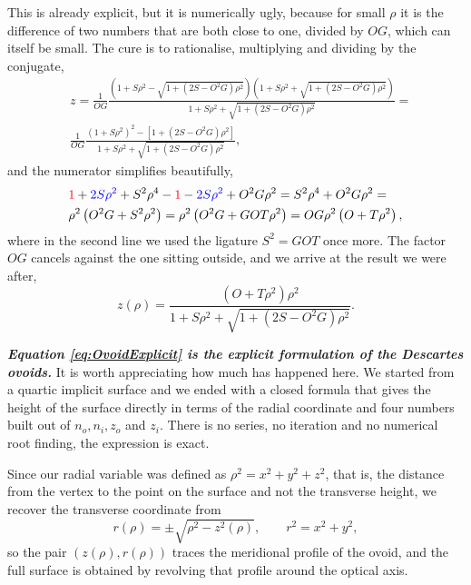                 This is already explicit, but it is numerically ugly, because for small $\rho$ it is the difference of two numbers that are both close to one, divided by $OG$, which can itself be small. The cure is to rationalise, multiplying and dividing by the conjugate,
                \begin{align*}
                    & z = \frac{1}{OG}\frac{\left( 1 + S\rho^2 - \sqrt{1+\left(2S-O^2G\right)\rho^2} \right)\left( 1 + S\rho^2 + \sqrt{1+\left(2S-O^2G\right)\rho^2} \right)}{1+S\rho^2 + \sqrt{1+\left(2S-O^2G\right)\rho^2}} = \\
                    & \frac{1}{OG}\frac{\left( 1+S\rho^2 \right)^2 - \left[ 1 + \left( 2S-O^2G \right)\rho^2 \right]}{1+S\rho^2+\sqrt{1+\left(2S-O^2G\right)\rho^2}},
                \end{align*}
                and the numerator simplifies beautifully,
                \begin{align*}
                    & {\color{red} 1} + {\color{blue} 2S\rho^2} + S^2\rho^4 - {\color{red} 1} - {\color{blue} 2S\rho^2} + O^2G\rho^2 = S^2\rho^4 + O^2G\rho^2 = \\
                    & \rho^2\left( O^2G + S^2\rho^2 \right) = \rho^2\left( O^2G + GOT\rho^2 \right) = OG\rho^2\left( O + T\rho^2 \right),
                \end{align*}
                where in the second line we used the ligature $S^2 = GOT$ once more. The factor $OG$ cancels against the one sitting outside, and we arrive at the result we were after,
                \begin{equation}\label{eq:OvoidExplicit}
                    z(\rho) = \frac{\left( O + T\rho^2 \right)\rho^2}{1 + S\rho^2 + \sqrt{1 + \left( 2S - O^2G \right)\rho^2}}.
                \end{equation}

                \textbf{\textit{Equation \ref{eq:OvoidExplicit} is the explicit formulation of the Descartes ovoids.}} It is worth appreciating how much has happened here. We started from a quartic implicit surface and we ended with a closed formula that gives the height of the surface directly in terms of the radial coordinate and four numbers built out of $n_o,n_i,z_o$ and $z_i$. There is no series, no iteration and no numerical root finding, the expression is exact.

                Since our radial variable was defined as $\rho^2 = x^2+y^2+z^2$, that is, the distance from the vertex to the point on the surface and not the transverse height, we recover the transverse coordinate from
                \begin{equation}\label{eq:TransverseFromSag}
                    r(\rho) = \pm\sqrt{\rho^2 - z^2(\rho)}, \qquad r^2 = x^2+y^2,
                \end{equation}
                so the pair $\left( z(\rho), r(\rho) \right)$ traces the meridional profile of the ovoid, and the full surface is obtained by revolving that profile around the optical axis.

